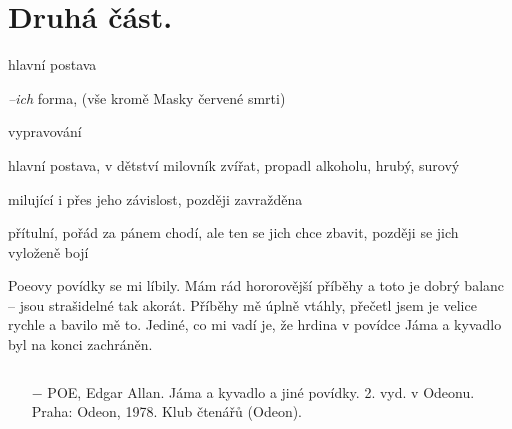 \documentclass{article}
\begin{document}
\section{Druhá část.}
\begin{description}
    \setlength\itemsep{0.15em}
    \item[vypravěč:] hlavní postava
    \item[vyprávěcí způsoby:] \textit{--ich} forma, (vše kromě Masky červené smrti)
    \item[typy promluv:] vypravování
    \item[postavy:]
        \begin{description}
            \setlength\itemsep{0.15em}
            \item[vypravěč,] hlavní postava, v dětství milovník zvířat, propadl alkoholu, hrubý, surový
            \item[manželka vypravěčova,] milující i přes jeho závislost, později zavražděna
            \item[kocouři,] přítulní, pořád za pánem chodí, ale ten se jich chce zbavit, později se jich vyloženě bojí
        \end{description}
    \item[názor:] Poeovy povídky se mi líbily. Mám rád hororovější příběhy a toto je dobrý balanc -- jsou strašidelné tak akorát. Příběhy mě úplně vtáhly, přečetl jsem je velice rychle a bavilo mě to. Jediné, co mi vadí je, že hrdina v povídce Jáma a kyvadlo byl na konci zachráněn.
    \item[zdroje:] $ $
    \begin{itemize}
        \setlength\itemsep{0em}
        \item[$-$] POE, Edgar Allan. Jáma a kyvadlo a jiné povídky. 2. vyd. v Odeonu. Praha: Odeon, 1978. Klub čtenářů (Odeon).
    \end{itemize}
\end{description}
\end{document}
